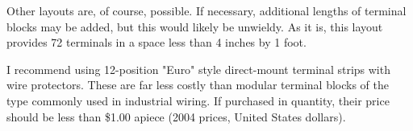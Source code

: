Other layouts are, of course, possible.  If necessary, additional lengths of terminal blocks may be added, but this would likely be unwieldy.  As it is, this layout provides 72 terminals in a space less than 4 inches by 1 foot.

I recommend using 12-position "Euro" style direct-mount terminal strips with wire protectors.  These are far less costly than modular terminal blocks of the type commonly used in industrial wiring.  If purchased in quantity, their price should be less than \$1.00 apiece (2004 prices, United States dollars).


